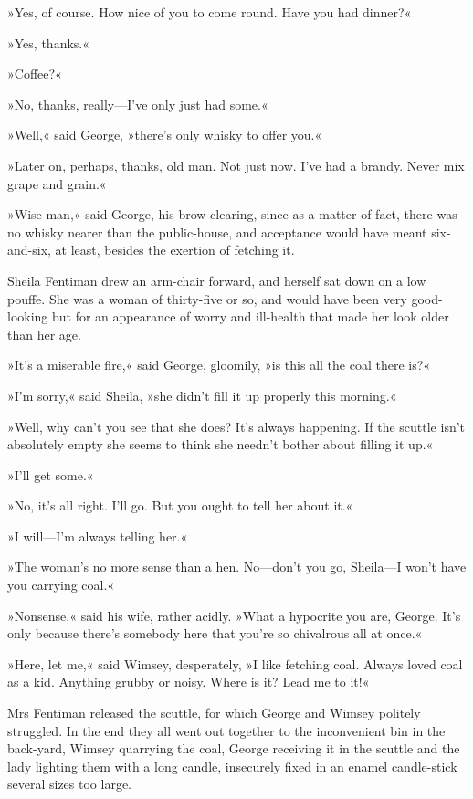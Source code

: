 »Yes, of course. How nice of you to come round. Have you had dinner?«

»Yes, thanks.«

»Coffee?«

»No, thanks, really\allowbreak---\allowbreak I've only just had some.«

»Well,« said George, »there's only whisky to offer you.«

»Later on, perhaps, thanks, old man. Not just now. I've had a brandy. Never mix grape and grain.«

»Wise man,« said George, his brow clearing, since as a matter of fact, there was no whisky nearer than the public-house, and acceptance would have meant six-and-six, at least, besides the exertion of fetching it.

Sheila Fentiman drew an arm-chair forward, and herself sat down on a low pouffe. She was a woman of thirty-five or so, and would have been very good-looking but for an appearance of worry and ill-health that made her look older than her age.

»It's a miserable fire,« said George, gloomily, »is this all the coal there is?«

»I'm sorry,« said Sheila, »she didn't fill it up properly this morning.«

»Well, why can't you see that she does? It's always happening. If the scuttle isn't absolutely empty she seems to think she needn't bother about filling it up.«

»I'll get some.«

»No, it's all right. I'll go. But you ought to tell her about it.«

»I will\allowbreak---\allowbreak I'm always telling her.«

»The woman's no more sense than a hen. No\allowbreak---\allowbreak don't you go, Sheila\allowbreak---\allowbreak I won't have you carrying coal.«

»Nonsense,« said his wife, rather acidly. »What a hypocrite you are, George. It's only because there's somebody here that you're so chivalrous all at once.«

»Here, let me,« said Wimsey, desperately, »I like fetching coal. Always loved coal as a kid. Anything grubby or noisy. Where is it? Lead me to it!«

Mrs Fentiman released the scuttle, for which George and Wimsey politely struggled. In the end they all went out together to the inconvenient bin in the back-yard, Wimsey quarrying the coal, George receiving it in the scuttle and the lady lighting them with a long candle, insecurely fixed in an enamel candle-stick several sizes too large.

